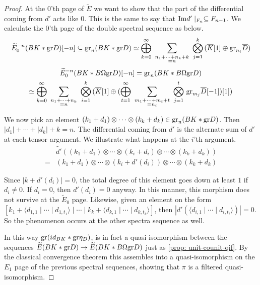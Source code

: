 \documentclass[../thesis.tex]{subfiles}
\begin{document}
\begin{proof}
                At the $0$'th page of $\widetilde{E}$ we want to show that the part of the differential coming from $d'$ acts like $0$. This is the same to say that $\tt{Im}d'\mid_{F_n} \subseteq F_{n-1}$. We calculate the $0$'th page of the double spectral sequence as below.
                \begin{multline*}
                    \widetilde{E}_0^{-n}(BK\ast\tt{gr}D)[-n] \subseteq \tt{gr}_n(BK\ast\tt{gr}D) \simeq \bigoplus_{k=0}^\infty\,\,\sum_{\substack{n_1+\cdots + n_k + k \\ = n}}\,\,\bigotimes_{j=1}^k\,(\overline{K}[1]\oplus\tt{gr}_{n_i}\overline{D})
                \end{multline*}
                \begin{multline*}
                    \widetilde{E}_0^{-n}(BK\ast B\Omega\tt{gr}D)[-n] = \tt{gr}_n(BK\ast B\Omega\tt{gr}D) \\ 
                    \simeq \bigoplus_{k=0}^\infty\,\,\sum_{\substack{n_1+\cdots + n_k \\ = n}}\,\,\bigotimes_{i=1}^k\,(\overline{K}[1]\oplus(\bigoplus_{t=1}^\infty\,\,\sum_{\substack{m_1+\cdots + m_t + t \\ = n_i}}\,\,\bigotimes_{j=1}^t\,\tt{gr}_{m_j}\overline{D}[-1])[1])
                \end{multline*}

                We now pick an element $(k_1 + d_1) \otimes \cdots \otimes (k_k + d_k) \in \tt{gr}_n(BK\ast \tt{gr}D)$. Then $|d_1| + \cdots + |d_k| + k = n$. The differential coming from $d'$ is the alternate sum of $d'$ at each tensor argument. We illustrate what happens at the $i$'th argument.
                \begin{align*}                    
                    & \widetilde{d'}((k_1 + d_1) \otimes \cdots \otimes (k_i + d_i) \otimes \cdots \otimes (k_k + d_k)) \\ 
                    = & (k_1 + d_1) \otimes \cdots \otimes (k_i + d'(d_i)) \otimes \cdots \otimes (k_k + d_k) 
                \end{align*}

                Since $|k+d'(d_i)| = 0$, the total degree of this element goes down at least $1$ if $d_i \neq 0$. If $d_i = 0$, then $d'(d_i) = 0$ anyway. In this manner, this morphism does not survive at the $\widetilde{E}_0$ page. Likewise, given an element on the form $[k_1 + \langle d_{1,1} \mid \cdots \mid d_{1,t_1} \rangle \mid \cdots \mid k_k + \langle d_{k,1} \mid \cdots \mid d_{k,t_k} \rangle ]$, then $|d'(\langle d_{i,1} \mid \cdots \mid d_{i,t_i} \rangle)| = 0$. So the phenomenon occurs at the other spectra sequence as well.
                
                In this way $\tt{gr}(id_{BK}\ast\tt{gr}\eta_D)$, is in fact a quasi-isomorphism between the sequences $\widetilde{E}(BK\ast\tt{gr}D) \rightarrow \widetilde{E}(BK\ast B\Omega\tt{gr}D)$ just as \ref{prop: unit-counit-qif}. By the classical convergence theorem this assembles into a quasi-isomorphism on the $E_1$ page of the previous spectral sequences, showing that $\pi$ is a filtered quasi-isomorphism.
            \end{proof}
\end{document}
